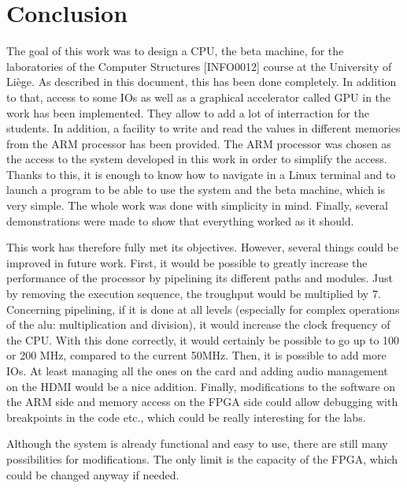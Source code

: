 \chapter{Conclusion}

The goal of this work was to design a CPU, the beta machine, for the laboratories of the Computer 
Structures [INFO0012] 
course at the University of Liège. As described in this document, this has been done completely. In 
addition to that, access to some IOs as well as a graphical accelerator called GPU in the work has been
implemented. They allow to add a lot of interraction for the students. In addition, a facility to write and read the values in different memories from the ARM processor has been provided. 
The ARM processor was chosen as the access to the system developed in this work in order to simplify 
the access.  Thanks to this, it is enough to know how to navigate in a Linux terminal and to launch a program 
to be able to use the system and the beta machine, which is very simple. The whole work was done with simplicity in mind.  Finally, several demonstrations were 
made to show that everything worked as it should.

This work has therefore fully met its objectives. However, several things could be improved in future 
work. First, it would be possible to greatly increase the performance of the processor by pipelining 
its different paths and modules. Just by removing the execution sequence, the troughput would be 
multiplied by 7. Concerning pipelining, if it is done at all levels (especially for complex operations 
of the alu: multiplication and division), it would increase the clock frequency of the CPU. With 
this done correctly, it would certainly be possible to go up to 100 or 200 MHz, compared to the current 50MHz. Then, it 
is possible to add more IOs. At least managing all the ones on the card and adding audio management 
on the HDMI would be a nice addition. Finally, modifications to the software on the ARM side and 
memory access on the FPGA side could allow debugging with breakpoints in the code etc., which could 
be really interesting for the labs. 

Although the system is already functional and easy to use, there are still many possibilities for 
modifications. The only limit is the capacity of the FPGA, which could be changed anyway if needed.
